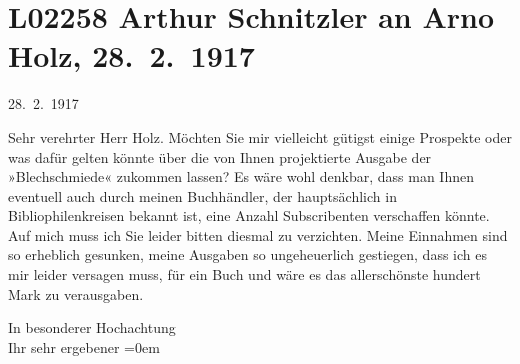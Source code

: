 

\section[Arthur Schnitzler an Arno Holz, 28. 2. 1917]{L02258 Arthur Schnitzler an Arno Holz, 28. 2. 1917}
\nopagebreak{}
\rehead{ }\normalsize\beginnumbering{}
\toendnotes[C]{\smallbreak\pagebreak[2]}
\toendnotes[C]{\smallbreak}
\toendnotes[C]{\smallbreak}
\pstart
           \raggedleft{}{\pb}28. 2. 1917\pend
           
\pstart\center{}Sehr verehrter Herr Holz.\pend\vspace{0.5em}
\pstart
           Möchten Sie mir vielleicht gütigst einige Prospekte oder was dafür gelten könnte über
               die von Ihnen projektierte Ausgabe der »Blechschmiede« zukommen lassen? Es wäre wohl denkbar, dass man Ihnen
               eventuell auch durch meinen Buchhändler, der hauptsächlich in Bibliophilenkreisen bekannt ist, eine
               Anzahl Subscribenten verschaffen könnte. Auf mich muss ich Sie leider bitten diesmal
               zu verzichten. Meine Einnahmen sind so erheblich gesunken, meine Ausgaben so
               ungeheuerlich gestiegen, dass \introOben{}ich\introOben{} es mir leider versagen
               muss, für ein Buch und wäre es das allerschönste hundert Mark zu verausgaben.\pend
           
\pstart
           In besonderer Hochachtung{\\[\baselineskip]} Ihr sehr ergebener\pend
           \leftskip=0em{}\endnumbering{}  \newcommand{\dateiname}{L02258}\newcommand{\titel}{Arthur Schnitzler an Arno Holz, 28. 2. 1917}\newcommand{\editorInnen}{Martin Anton Müller und Gerd-Hermann Susen}
